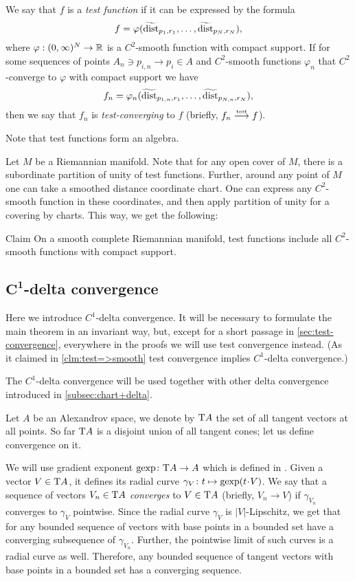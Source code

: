 We say that $f$ is a \emph{test function} if it can be expressed by the formula
$$f=\varphi( \widetilde{\operatorname{\rm dist}}_{p_1,r_1}, \dots,   \widetilde{\operatorname{\rm dist}}_{p_N,r_N}),$$
where $\varphi:(0,\infty)^N\to\mathbb{R}$ is a $C^2$-smooth function with compact support.
If for some sequences of points $A_n\ni p_{i,n}\to p_i\in A$ and $C^2$-smooth functions $\varphi_n$ that $C^2$-converge to $\varphi$ with compact support we have
$$f_n=\varphi_n( \widetilde{\operatorname{\rm dist}}_{p_{1,n},r_1},\dots,   \widetilde{\operatorname{\rm dist}}_{p_{N,n},r_N}),$$
then we say that $f_n$ is \emph{test-converging} to $f$ (briefly, $f_n\zz\testto f$).

Note that test functions form an algebra.

Let $M$ be a Riemannian manifold.
Note that for any open cover of $M$, there is a subordinate partition of unity of test functions.
Further, around any point of $M$ one can take a smoothed distance 
coordinate chart.
One can express any $C^2$-smooth function in these 
coordinates, and then apply partition of unity for a covering by charts.
This way, we get the following:

\begin{thm}{Claim}
On a smooth complete Riemannian manifold, test functions
include all $C^2$-smooth functions with compact support.
\end{thm}


\subsection[$C^1$-delta convergence]{$\bm{C^1}$-delta convergence}\label{sec:concept}

Here we introduce $C^1$-delta convergence.
It will be necessary to formulate the main theorem in an invariant way, but, except for a short passage in \ref{sec:test-convergence}, everywhere in the proofs we will use test convergence instead.
(As it claimed in \ref{clm:test=>smooth} test convergence implies $C^1$-delta convergence.)

The $C^1$-delta convergence will be used together with other delta convergence introduced in \ref{subsec:chart+delta}.

Let $A$ be an Alexandrov space, we denote by $\mathrm{T} A$ the set of all tangent vectors at all points.
So far $\mathrm{T} A$ is a disjoint union of all tangent cones;
let us define convergence on it.

We will use gradient exponent $\mathop{\rm gexp}\colon \mathrm{T} A\to A$ which is defined in \cite{AKP}.
Given a vector $V\in \mathrm{T} A$, it defines its radial curve $\gamma_{V}\:t\zz\mapsto \gexp (t\cdot V)$.
We say that a sequence of vectors $V_n\in \mathrm{T} A$ \emph{converges} to $V\in \mathrm{T} A$ (briefly, $V_n\to V$) if $\gamma_{V_n}$ converges to $\gamma_V$ pointwise.
Since the radial curve $\gamma_V$ is $|V|$-Lipschitz, we get that for any bounded sequence of vectors with base points in a bounded set have a converging subsequence of $\gamma_{V_n}$.
Further, the pointwise limit of such curves is a radial curve as well.
Therefore, any bounded sequence of tangent vectors with base points in a bounded set has a converging sequence.

